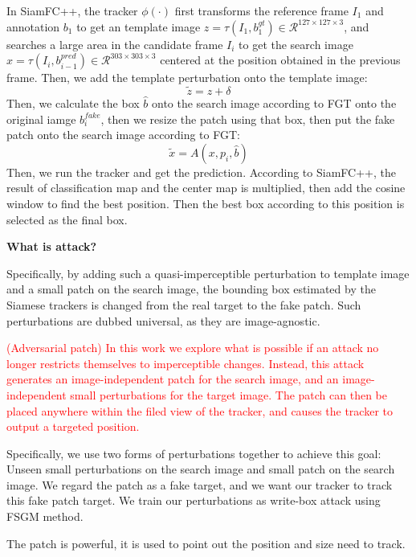 \documentclass{article}
\begin{document}
In SiamFC++, the tracker $\phi(\cdot)$ first transforms the reference frame $I_1$ and annotation $b_1$ to get an template image $z = \tau (I_1, b^{gt}_1)\in \mathcal{R}^{127\times 127\times 3}$, and searches a large area in the candidate frame $I_i$ to get the search image $x = \tau(I_i, b_{i-1}^{pred})\in \mathcal{R}^{303\times 303 \times 3}$ centered at the position obtained in the previous frame.
Then, we add the template perturbation onto the template image:
\begin{equation}
\tilde z = z + \delta
\end{equation}
Then, we calculate the box $\hat b$ onto the search image according to FGT onto the original iamge $b^{fake}_i$, then we resize the patch using that box, then put the fake patch onto the search image according to FGT:
\begin{equation}
\tilde x = A(x, p_i, \hat b)
\end{equation}
Then, we run the tracker and get the prediction. According to SiamFC++, the result of classification map and the center map is multiplied, then add the cosine window to find the best position. Then the best box according to this position is selected as the final box.

\textbf{What is attack?}

Specifically, by adding such a quasi-imperceptible perturbation to template image and a small patch on the search image, the bounding box estimated by the Siamese trackers is changed from the real target to the fake patch. Such perturbations are dubbed universal, as they are image-agnostic.

\textcolor{red}{(Adversarial patch) In this work we explore what is possible if an attack no longer restricts themselves to imperceptible changes. Instead, this attack generates an image-independent patch for the search image, and an image-independent small perturbations for the target image. The patch can then be placed anywhere within the filed view of the tracker, and causes the tracker to output a targeted position.}

Specifically, we use two forms of perturbations together to achieve this goal: Unseen small perturbations on the search image and small patch on the search image. We regard the patch as a fake target, and we want our tracker to track this fake patch target. We train our perturbations as write-box attack using FSGM \cite{FGSM} method.

The patch is powerful, it is used to point out the position and size need to track.
\end{document}

